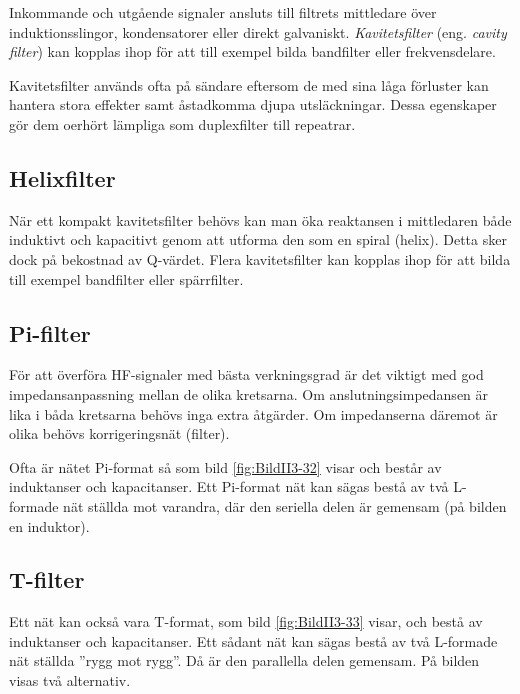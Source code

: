 Inkommande och utgående signaler ansluts till filtrets mittledare över
induktionsslingor, kondensatorer eller direkt galvaniskt.
\emph{Kavitetsfilter} (eng. \emph{cavity filter}) kan kopplas ihop för att till exempel 
bilda bandfilter eller frekvensdelare.

Kavitetsfilter används ofta på sändare eftersom de med sina låga förluster kan
hantera stora effekter samt åstadkomma djupa utsläckningar.
Dessa egenskaper gör dem oerhört lämpliga som duplexfilter till repeatrar.

\subsection{Helixfilter}

När ett kompakt kavitetsfilter behövs kan man öka reaktansen i mittledaren
både induktivt och kapacitivt genom att utforma den som en spiral (helix).
Detta sker dock på bekostnad av Q-värdet.
Flera kavitetsfilter kan kopplas ihop för att bilda till exempel bandfilter eller spärrfilter.

\subsection{Pi-filter}


För att överföra HF-signaler med bästa verkningsgrad är det viktigt med god
impedansanpassning mellan de olika kretsarna.
Om anslutningsimpedansen är lika i båda kretsarna behövs inga extra åtgärder.
Om impedanserna däremot är olika behövs korrigeringsnät (filter).

Ofta är nätet Pi-format så som bild \ref{fig:BildII3-32} visar och består av
induktanser och kapacitanser.
Ett Pi-format nät kan sägas bestå av två L-formade nät ställda mot varandra, där
den seriella delen är gemensam (på bilden en induktor).

\subsection{T-filter}


Ett nät kan också vara T-format, som bild \ref{fig:BildII3-33} visar, och bestå
av induktanser och kapacitanser.
Ett sådant nät kan sägas bestå av två L-formade nät ställda ''rygg mot rygg''.
Då är den parallella delen gemensam.
På bilden visas två alternativ.

